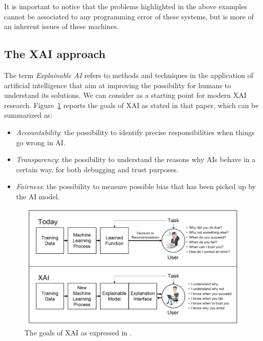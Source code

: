 \documentclass[conference]{IEEEtran}
\begin{document}
It is important to notice that the problems highlighted in the above examples
cannot be associated to any programming error of these systems, but is more of an inherent issues of these machines.


\subsection{The XAI approach}
\label{sec:xai}

The term \textit{Explainable AI} refers to methods and techniques in the application of artificial intelligence that aim at improving the possibility for humans to understand its solutions. We can consider \citet{DARPA} as a starting point for modern XAI research. Figure~\ref{fig:xai} reports the goals of XAI as stated in that paper, which can be summarized as:

\begin{itemize}
    \item \textit{Accountability}: the possibility to identify precise responsibilities when things go wrong in AI.
    \item \textit{Transparency}: the possibility to understand the reasons why AIs behave in a certain way, for both debugging and trust purposes.
    \item \textit{Fairness}: the possibility to measure possible bias that has been picked up by the AI model.
\end{itemize}

\begin{figure}[h!] \includegraphics[width=\linewidth]{images/xai.png}
    \caption{The goals of XAI as expressed in \citet{DARPA}. } \label{fig:xai} \end{figure}
\end{document}
